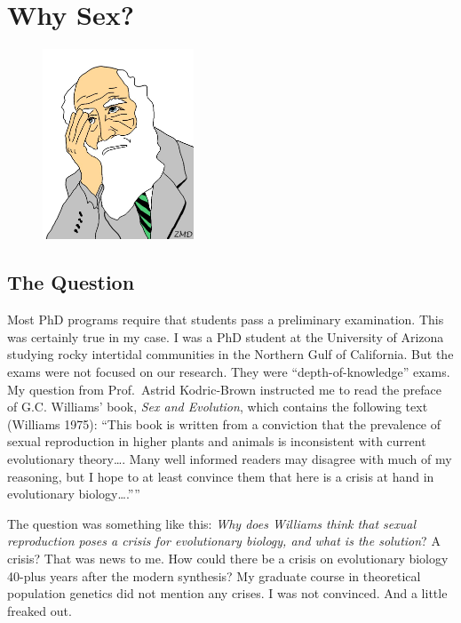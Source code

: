 \documentclass[
  letterpaper,
]{book}
\begin{document}
\hypertarget{sec-why-sex}{%
\chapter{Why Sex?}\label{sec-why-sex}}

\begin{figure}

{\centering \includegraphics[width=0.4\textwidth,height=\textheight]{images/Picture1.png}

}

\end{figure}

\hypertarget{the-question}{%
\section{The Question}\label{the-question}}

Most PhD programs require that students pass a preliminary examination.
This was certainly true in my case. I was a PhD student at the
University of Arizona studying rocky intertidal communities in the
Northern Gulf of California. But the exams were not focused on our
research. They were ``depth-of-knowledge'' exams. My question from
Prof.~Astrid Kodric-Brown instructed me to read the preface of G.C.
Williams' book, \emph{Sex and Evolution}, which contains the following
text (Williams 1975): ``This book is written from a conviction that the
prevalence of sexual reproduction in higher plants and animals is
inconsistent with current evolutionary theory\ldots. Many well informed
readers may disagree with much of my reasoning, but I hope to at least
convince them that here is a crisis at hand in evolutionary
biology\ldots.''''

The question was something like this: \emph{Why does Williams think that
sexual reproduction poses a crisis for evolutionary biology, and what is
the solution}? A crisis? That was news to me. How could there be a
crisis on evolutionary biology 40-plus years after the modern synthesis?
My graduate course in theoretical population genetics did not mention
any crises. I was not convinced. And a little freaked out.
\end{document}
